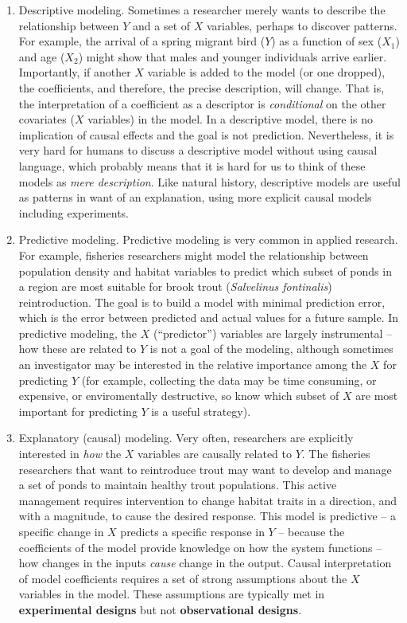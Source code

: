 \documentclass[]{book}
\begin{document}
\begin{enumerate}
\def\labelenumi{\arabic{enumi}.}
\item
  Descriptive modeling. Sometimes a researcher merely wants to describe
  the relationship between \(Y\) and a set of \(X\) variables, perhaps
  to discover patterns. For example, the arrival of a spring migrant
  bird (\(Y\)) as a function of sex (\(X_1\)) and age (\(X_2\)) might
  show that males and younger individuals arrive earlier. Importantly,
  if another \(X\) variable is added to the model (or one dropped), the
  coefficients, and therefore, the precise description, will change.
  That is, the interpretation of a coefficient as a descriptor is
  \emph{conditional} on the other covariates (\(X\) variables) in the
  model. In a descriptive model, there is no implication of causal
  effects and the goal is not prediction. Nevertheless, it is very hard
  for humans to discuss a descriptive model without using causal
  language, which probably means that it is hard for us to think of
  these models as \emph{mere description}. Like natural history,
  descriptive models are useful as patterns in want of an explanation,
  using more explicit causal models including experiments.
\item
  Predictive modeling. Predictive modeling is very common in applied
  research. For example, fisheries researchers might model the
  relationship between population density and habitat variables to
  predict which subset of ponds in a region are most suitable for brook
  trout (\emph{Salvelinus fontinalis}) reintroduction. The goal is to
  build a model with minimal prediction error, which is the error
  between predicted and actual values for a future sample. In predictive
  modeling, the \(X\) (``predictor'') variables are largely instrumental
  -- how these are related to \(Y\) is not a goal of the modeling,
  although sometimes an investigator may be interested in the relative
  importance among the \(X\) for predicting \(Y\) (for example,
  collecting the data may be time consuming, or expensive, or
  enviromentally destructive, so know which subset of \(X\) are most
  important for predicting \(Y\) is a useful strategy).
\item
  Explanatory (causal) modeling. Very often, researchers are explicitly
  interested in \emph{how} the \(X\) variables are causally related to
  \(Y\). The fisheries researchers that want to reintroduce trout may
  want to develop and manage a set of ponds to maintain healthy trout
  populations. This active management requires intervention to change
  habitat traits in a direction, and with a magnitude, to cause the
  desired response. This model is predictive -- a specific change in
  \(X\) predicts a specific response in \(Y\) -- because the
  coefficients of the model provide knowledge on how the system
  functions -- how changes in the inputs \emph{cause} change in the
  output. Causal interpretation of model coefficients requires a set of
  strong assumptions about the \(X\) variables in the model. These
  assumptions are typically met in \textbf{experimental designs} but not
  \textbf{observational designs}.
\end{enumerate}
\end{document}
